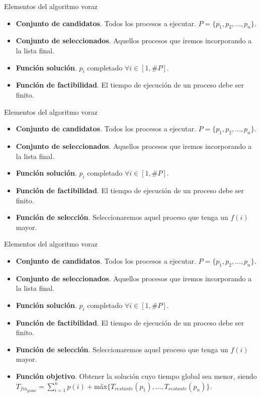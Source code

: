 \documentclass{beamer}
\begin{document}
\begin{frame}[fragile]{Elementos del algoritmo voraz}
\begin{itemize}
	\item \textbf{Conjunto de candidatos}. Todos los procesos a ejecutar. $P=\{p_1, p_2, ..., p_n\}$.
	\item \textbf{Conjunto de seleccionados}. Aquellos procesos que iremos incorporando a la lista final.
	\item \textbf{Función solución}. $p_i$ completado $\forall i \in [1,\#P]$.
	\item \textbf{Función de factibilidad}. El tiempo de ejecución de un proceso debe ser finito.
\end{itemize}
\end{frame}

\begin{frame}[fragile]{Elementos del algoritmo voraz}
\begin{itemize}
	\item \textbf{Conjunto de candidatos}. Todos los procesos a ejecutar. $P=\{p_1, p_2, ..., p_n\}$.
	\item \textbf{Conjunto de seleccionados}. Aquellos procesos que iremos incorporando a la lista final.
	\item \textbf{Función solución}. $p_i$ completado $\forall i \in [1,\#P]$.
	\item \textbf{Función de factibilidad}. El tiempo de ejecución de un proceso debe ser finito.
	\item \textbf{Función de selección}. Seleccionaremos aquel proceso que tenga un $f(i)$ mayor.
\end{itemize}
\end{frame}

\begin{frame}[fragile]{Elementos del algoritmo voraz}
\begin{itemize}
	\item \textbf{Conjunto de candidatos}. Todos los procesos a ejecutar. $P=\{p_1, p_2, ..., p_n\}$.
	\item \textbf{Conjunto de seleccionados}. Aquellos procesos que iremos incorporando a la lista final.
	\item \textbf{Función solución}. $p_i$ completado $\forall i \in [1,\#P]$.
	\item \textbf{Función de factibilidad}. El tiempo de ejecución de un proceso debe ser finito.
	\item \textbf{Función de selección}. Seleccionaremos aquel proceso que tenga un $f(i)$ mayor.
	\item \textbf{Función objetivo}. Obtener la solución cuyo tiempo global sea menor, siendo $T_{fin_{global}} = \sum_{i=1}^{n} p(i) + $máx$\{T_{restante}(p_1),...,T_{restante}(p_n)\}$.
\end{itemize}
\end{frame}
\end{document}
